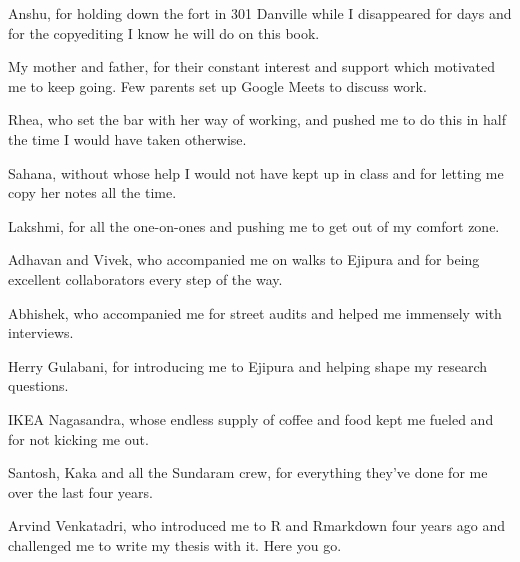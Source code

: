 Anshu, for holding down the fort in 301 Danville while I disappeared for days and for the copyediting I know he will do on this book.

My mother and father, for their constant interest and support which motivated me to keep going. Few parents set up Google Meets to discuss work.

Rhea, who set the bar with her way of working, and pushed me to do this in half the time I would have taken otherwise.

Sahana, without whose help I would not have kept up in class and for letting me copy her notes all the time.

Lakshmi, for all the one-on-ones and pushing me to get out of my comfort zone.

Adhavan and Vivek, who accompanied me on walks to Ejipura and for being excellent collaborators every step of the way.

Abhishek, who accompanied me for street audits and helped me immensely with interviews.

Herry Gulabani, for introducing me to Ejipura and helping shape my research questions.

IKEA Nagasandra, whose endless supply of coffee and food kept me fueled and for not kicking me out.

Santosh, Kaka and all the Sundaram crew, for everything they've done for me over the last four years.

Arvind Venkatadri, who introduced me to R and Rmarkdown four years ago and challenged me to write my thesis with it. Here you go.

\setlength{\abovedisplayskip}{-5pt}
\setlength{\abovedisplayshortskip}{-5pt}
